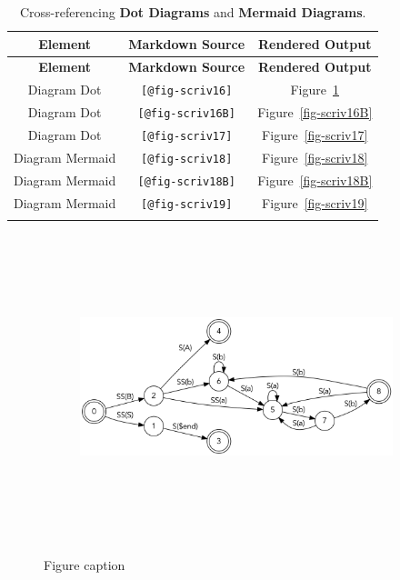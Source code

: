\documentclass[
  12pt,
  a4paper,
  oneside,
  titlepage,
  toclink=all,
  toc=bibliography]{scrbook}
\theoremstyle{definition}
\theoremstyle{plain}
\theoremstyle{plain}
\theoremstyle{plain}
\theoremstyle{plain}
\theoremstyle{definition}
\theoremstyle{definition}
\theoremstyle{plain}
\theoremstyle{remark}
\begin{document}
\hypertarget{tbl-scriv15}{}
\begin{longtable}[]{@{}ccc@{}}
\toprule\noalign{}
\textbf{Element} & \textbf{Markdown Source} & \textbf{Rendered
Output} \\
\midrule\noalign{}
\endfirsthead
\toprule\noalign{}
\textbf{Element} & \textbf{Markdown Source} & \textbf{Rendered
Output} \\
\midrule\noalign{}
\endhead
\bottomrule\noalign{}
\endlastfoot
Diagram Dot & \texttt{{[}@fig-scriv16{]}} &
\protect\hypertarget{cite_50}{}{\label{cite_50}Figure~\ref{fig-scriv16}} \\
Diagram Dot & \texttt{{[}@fig-scriv16B{]}} &
\protect\hypertarget{cite_51}{}{\label{cite_51}Figure~\ref{fig-scriv16B}} \\
Diagram Dot & \texttt{{[}@fig-scriv17{]}} &
\protect\hypertarget{cite_52}{}{\label{cite_52}Figure~\ref{fig-scriv17}} \\
Diagram Mermaid & \texttt{{[}@fig-scriv18{]}} &
\protect\hypertarget{cite_53}{}{\label{cite_53}Figure~\ref{fig-scriv18}} \\
Diagram Mermaid & \texttt{{[}@fig-scriv18B{]}} &
\protect\hypertarget{cite_54}{}{\label{cite_54}Figure~\ref{fig-scriv18B}} \\
Diagram Mermaid & \texttt{{[}@fig-scriv19{]}} &
\protect\hypertarget{cite_55}{}{\label{cite_55}Figure~\ref{fig-scriv19}} \\
\caption{\label{tbl-scriv15}Cross-referencing \textbf{Dot Diagrams} and
\textbf{Mermaid Diagrams}.}\tabularnewline
\end{longtable}

\begin{figure}

{\centering 

\begin{figure}[H]

{\centering \includegraphics[width=5.5in,height=3.5in]{index_files/figure-latex/dot-figure-1.png}

}

\end{figure}

}

\caption{\label{fig-scriv16}Figure caption}

\end{figure}
\end{document}
